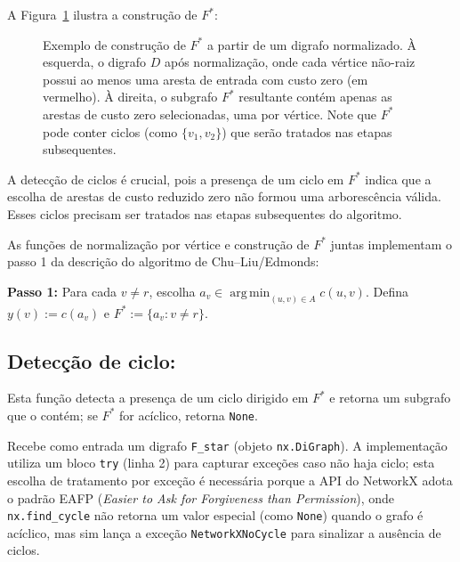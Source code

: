 A Figura~\ref{fig:get-fstar-example} ilustra a construção de \(F^*\):

\begin{figure}[H]
    \centering
    
    \caption{Exemplo de construção de \(F^*\) a partir de um digrafo normalizado. À esquerda, o digrafo \(D\) após normalização, onde cada vértice não-raiz possui ao menos uma aresta de entrada com custo zero (em vermelho). À direita, o subgrafo \(F^*\) resultante contém apenas as arestas de custo zero selecionadas, uma por vértice. Note que \(F^*\) pode conter ciclos (como \(\{v_1, v_2\}\)) que serão tratados nas etapas subsequentes.}
    \label{fig:get-fstar-example}
\end{figure}

A detecção de ciclos é crucial, pois a presença de um ciclo em \(F^*\) indica que a escolha de arestas de custo reduzido zero não formou uma arborescência válida. Esses ciclos precisam ser tratados nas etapas subsequentes do algoritmo.

As funções de normalização por vértice e construção de \(F^*\) juntas implementam o passo 1 da descrição do algoritmo de Chu–Liu/Edmonds:

\begin{tcolorbox}[
        enhanced, breakable,
        colframe=green!60!black, colback=green!5,
        colbacktitle=green!20, coltitle=black,
        title={Passo 1 do Algoritmo de Chu–Liu/Edmonds},
        boxed title style={sharp corners, boxrule=0.6pt},
        sharp corners, boxrule=0.6pt
    ]
    \textbf{Passo 1:} Para cada \(v\neq r\), escolha \(a_v\in\mathop{\mathrm{arg\,min}}_{(u,v)\in A} c(u,v)\). Defina \(y(v):=c(a_v)\) e \(F^*:=\{a_v : v\neq r\}\).
\end{tcolorbox}



\subsection{Detecção de ciclo:}
Esta função detecta a presença de um ciclo dirigido em \(F^*\) e retorna um subgrafo que o contém; se \(F^*\) for acíclico, retorna \texttt{None}.

Recebe como entrada um digrafo \texttt{F\_star} (objeto \texttt{nx.DiGraph}). A implementação utiliza um bloco \texttt{try} (linha 2) para capturar exceções caso não haja ciclo; esta escolha de tratamento por exceção é necessária porque a API do NetworkX adota o padrão EAFP (\emph{Easier to Ask for Forgiveness than Permission}), onde \texttt{nx.find\_cycle} não retorna um valor especial (como \texttt{None}) quando o grafo é acíclico, mas sim lança a exceção \texttt{NetworkXNoCycle} para sinalizar a ausência de ciclos.


